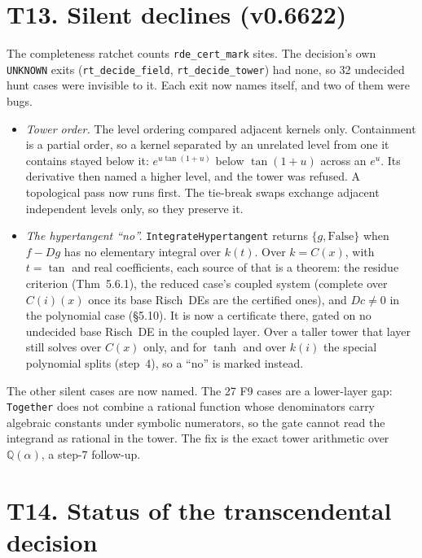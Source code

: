 \documentclass[11pt]{article}
\theoremstyle{definition}
\theoremstyle{remark}
\newcommand{\Q}{\mathbb{Q}}
\newcommand{\code}[1]{\texttt{#1}}
\begin{document}
\section*{T13. Silent declines (v0.6622)}
\label{sec:T13}

The completeness ratchet counts \code{rde\_cert\_mark} sites. The decision's own
\code{UNKNOWN} exits (\code{rt\_decide\_field}, \code{rt\_decide\_tower}) had none, so 32
undecided hunt cases were invisible to it. Each exit now names itself, and two of them
were bugs.
\begin{itemize}
\item \emph{Tower order.} The level ordering compared adjacent kernels only. Containment
  is a partial order, so a kernel separated by an unrelated level from one it contains
  stayed below it: $e^{u\tan(1+u)}$ below $\tan(1+u)$ across an $e^u$. Its derivative
  then named a higher level, and the tower was refused. A topological pass now runs
  first. The tie-break swaps exchange adjacent independent levels only, so they preserve
  it.
\item \emph{The hypertangent ``no''.} \code{IntegrateHypertangent} returns
  $\{g,\mathrm{False}\}$ when $f-Dg$ has no elementary integral over $k(t)$. Over
  $k=C(x)$, with $t=\tan$ and real coefficients, each source of that is a theorem: the
  residue criterion (Thm~5.6.1), the reduced case's coupled system (complete over
  $C(i)(x)$ once its base Risch~DEs are the certified ones), and $Dc\neq0$ in the
  polynomial case (\S5.10). It is now a certificate there, gated on no undecided base
  Risch~DE in the coupled layer. Over a taller tower that layer still solves over
  $C(x)$ only, and for $\tanh$ and over $k(i)$ the special polynomial splits (step~4),
  so a ``no'' is marked instead.
\end{itemize}
The other silent cases are now named. The 27 F9 cases are a lower-layer gap:
\code{Together} does not combine a rational function whose denominators carry
algebraic constants under symbolic numerators, so the gate cannot read the integrand as
rational in the tower. The fix is the exact tower arithmetic over $\Q(\alpha)$, a step-7
follow-up.

\section*{T14. Status of the transcendental decision}
\end{document}
